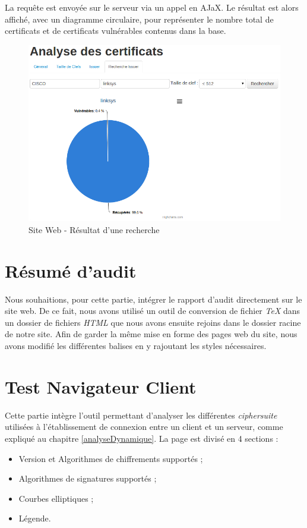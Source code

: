 La requête est envoyée sur le serveur via un appel en AJaX. Le résultat est alors affiché, avec un diagramme circulaire, pour représenter le nombre total de certificats et de certificats vulnérables contenus dans la base.

\begin{figure}[H]
\begin{center}
\includegraphics[scale=0.5]{images/site_web_search_result.png}
\end{center}
\caption{Site Web - Résultat d'une recherche}
\label{search_result}
\end{figure}

 
\section{Résumé d'audit}

Nous souhaitions, pour cette partie, intégrer le rapport d'audit directement sur le site web. De ce fait, nous avons utilisé un outil de conversion de fichier \textit{TeX} dans un dossier de fichiers \textit{HTML} que nous avons ensuite rejoins dans le dossier racine de notre site. Afin de garder la même mise en forme des pages web du site, nous avons modifié les différentes balises en y rajoutant les styles nécessaires.


\section{Test Navigateur Client}

Cette partie intègre l'outil permettant d'analyser les différentes \textit{ciphersuite} utilisées à l'établissement de connexion entre un client et un serveur, comme expliqué au chapitre \ref{analyseDynamique}. La page est divisé en 4 sections :
\begin{itemize}
\item Version et Algorithmes de chiffrements supportés ;
\item Algorithmes de signatures supportés ;
\item Courbes elliptiques ;
\item Légende.\\
\end{itemize}

